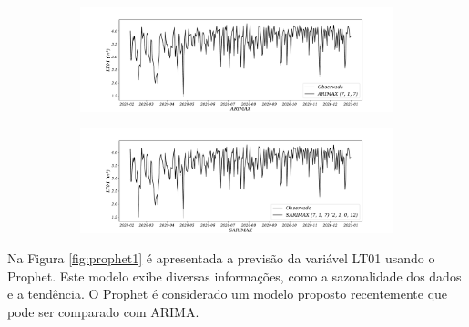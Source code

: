 \begin{figure}[H]
	\centering
	\caption{Comparação entre ARIMAX e SARIMAX \label{fig:1-arimax}\label{fig:1-sarimax}}
	\begin{subfigure}{1\textwidth}
		\includegraphics[width=\linewidth]{Modelos/Figuras/ARIMAX}
		
		
	\end{subfigure}
	\hfill
	
	\begin{subfigure}{1\textwidth}
		\includegraphics[width=\linewidth]{Modelos/Figuras/SARIMAX}
		
			
	\end{subfigure}
	
	
\end{figure}

Na Figura \ref{fig:prophet1} é apresentada a previsão da variável LT01 usando o Prophet. Este modelo exibe diversas informações, como a sazonalidade dos dados e a tendência. O Prophet é considerado um modelo proposto recentemente que pode ser comparado com ARIMA. 



%
%	
%	

